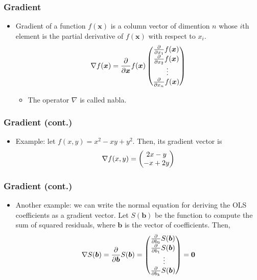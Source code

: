 \documentclass[pdflatex, 12pt]{beamer}
\begin{document}
\begin{frame}
\frametitle{Gradient}
\begin{itemize}
\item {\color{red} Gradient} of a function $f(\bm{x})$ is a column vector of dimention $n$ whose $i$th element is the partial derivative of $f(\bm{x})$ with respect to $x_i$.
 \begin{equation}
 \nabla f(\bm{x}) = \frac{\partial}{\partial \bm{x}} f(\bm{x}) \begin{pmatrix}
 \frac{\partial}{\partial x_1} f(\bm{x}) \\
 \frac{\partial}{\partial x_2} f(\bm{x}) \\
 \ \vdots \\
 \frac{\partial}{\partial x_n} f(\bm{x}) \\
 \end{pmatrix} \notag
 \end{equation}
 \begin{itemize}
 \item The operator $\nabla$ is called {\color{red} nabla}.
 \end{itemize}
\end{itemize}
\end{frame}

\begin{frame}
\frametitle{Gradient (cont.)}
\begin{itemize}
\item Example: let $f(x, y) = x^2 - xy + y^2$. Then, its gradient vector is 
 \begin{equation}
 \nabla f(x, y) = \begin{pmatrix}
 2x - y \\
 -x + 2y \\
 \end{pmatrix} \notag
 \end{equation}
\end{itemize}
\end{frame}

\begin{frame}
\frametitle{Gradient (cont.)}
\begin{itemize}
\item Another example: we can write the normal equation for deriving the OLS coefficients as a gradient vector. Let $S(\bm{b})$ be the function to compute the sum of squared residuals, where $\bm{b}$ is the vector of coefficients. Then, 
 \begin{equation}
 \nabla S(\bm{b}) = \frac{\partial}{\partial \bm{b}} S(\bm{b}) = \begin{pmatrix}
 \frac{\partial}{\partial b_0} S(\bm{b}) \\
 \frac{\partial}{\partial b_1} S(\bm{b}) \\
 \ \vdots \\
 \frac{\partial}{\partial b_k} S(\bm{b}) \\
 \end{pmatrix} = \bm{0} \notag
 \end{equation}
\end{itemize}
\end{frame}
\end{document}
